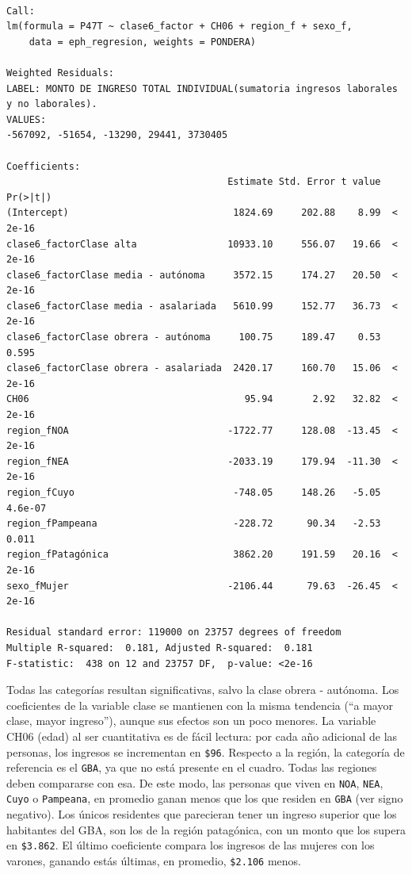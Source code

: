 \documentclass[
]{article}
\begin{document}
\begin{verbatim}

Call:
lm(formula = P47T ~ clase6_factor + CH06 + region_f + sexo_f, 
    data = eph_regresion, weights = PONDERA)

Weighted Residuals:
LABEL: MONTO DE INGRESO TOTAL INDIVIDUAL(sumatoria ingresos laborales y no laborales). 
VALUES:
-567092, -51654, -13290, 29441, 3730405

Coefficients:
                                       Estimate Std. Error t value Pr(>|t|)
(Intercept)                             1824.69     202.88    8.99  < 2e-16
clase6_factorClase alta                10933.10     556.07   19.66  < 2e-16
clase6_factorClase media - autónoma     3572.15     174.27   20.50  < 2e-16
clase6_factorClase media - asalariada   5610.99     152.77   36.73  < 2e-16
clase6_factorClase obrera - autónoma     100.75     189.47    0.53    0.595
clase6_factorClase obrera - asalariada  2420.17     160.70   15.06  < 2e-16
CH06                                      95.94       2.92   32.82  < 2e-16
region_fNOA                            -1722.77     128.08  -13.45  < 2e-16
region_fNEA                            -2033.19     179.94  -11.30  < 2e-16
region_fCuyo                            -748.05     148.26   -5.05  4.6e-07
region_fPampeana                        -228.72      90.34   -2.53    0.011
region_fPatagónica                      3862.20     191.59   20.16  < 2e-16
sexo_fMujer                            -2106.44      79.63  -26.45  < 2e-16

Residual standard error: 119000 on 23757 degrees of freedom
Multiple R-squared:  0.181, Adjusted R-squared:  0.181 
F-statistic:  438 on 12 and 23757 DF,  p-value: <2e-16
\end{verbatim}

Todas las categorías resultan significativas, salvo la clase obrera - autónoma. Los coeficientes de la variable clase se mantienen con la misma tendencia (``a mayor clase, mayor ingreso''), aunque sus efectos son un poco menores. La variable CH06 (edad) al ser cuantitativa es de fácil lectura: por cada año adicional de las personas, los ingresos se incrementan en \texttt{\$96}. Respecto a la región, la categoría de referencia es el \texttt{GBA}, ya que no está presente en el cuadro. Todas las regiones deben compararse con esa. De este modo, las personas que viven en \texttt{NOA}, \texttt{NEA}, \texttt{Cuyo} o \texttt{Pampeana}, en promedio ganan menos que los que residen en \texttt{GBA} (ver signo negativo). Los únicos residentes que parecieran tener un ingreso superior que los habitantes del GBA, son los de la región patagónica, con un monto que los supera en \texttt{\$3.862}. El último coeficiente compara los ingresos de las mujeres con los varones, ganando estás últimas, en promedio, \texttt{\$2.106} menos.
\end{document}
